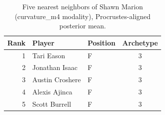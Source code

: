 \begin{table}[htbp]
  \centering\small
  \begin{tabular}{rllc}
    \toprule
    Rank & Player & Position & Archetype \\
    \midrule
    1 & Tari Eason & F & 3 \\
    2 & Jonathan Isaac & F & 3 \\
    3 & Austin Croshere & F & 3 \\
    4 & Alexis Ajinca & F & 3 \\
    5 & Scott Burrell & F & 3 \\
    \bottomrule
  \end{tabular}
  \caption{Five nearest neighbors of Shawn Marion (curvature_m4 modality), Procrustes-aligned posterior mean.}
  \label{tab:Shawn_Marion_neighbors_curvature_m4}
\end{table}

